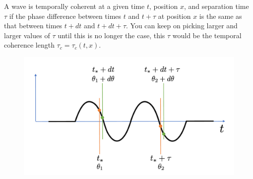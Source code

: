 \documentclass[a4paper,11pt]{report}
\begin{document}
A wave is temporally coherent at a given time $t$, position $x$, and separation time $\tau$ if the phase difference between times $t$ and $t+\tau$ at position $x$ is the same as that between times $t+dt$ and $t+dt+\tau$. You can keep on picking larger and larger values of $\tau$ until this is no longer the case, this $\tau$ would be the temporal coherence length $\tau_c = \tau_c(t,x)$.

\begin{figure}
    \centering
    \includegraphics[width=.7\textwidth]{../../images/temp_cohe_1.pdf}
    \caption{}
    \label{fig:laser_temp_cohe}
\end{figure}
\end{document}
